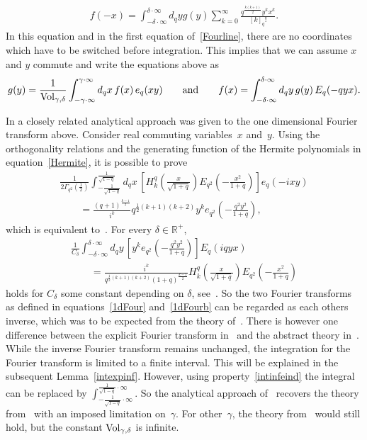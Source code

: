 \documentclass[pdftex]{sigma}
\newcommand{\mR}{\mathbb{R}}
\numberwithin{equation}{section}
\begin{document}
\begin{gather*}
f(-x) = \int_{-\delta\cdot\infty}^{\delta\cdot\infty}d_qyg(y)\sum_{k=0}^\infty\frac{q^{\frac{k(k+1)}{2}}y^kx^k}{[k]_q!}.
\end{gather*}
In this equation and in the f\/irst equation of~\eqref{Fourline}, there are no coordinates which have to be switched before integration. This implies that we can assume $x$ and $y$ commute and write the equations above as
\begin{gather*}
g(y)=\frac{1}{{\rm Vol}_{\gamma,\delta}}\int_{-\gamma\cdot\infty}^{\gamma\cdot\infty}d_qx\,f(x)\,e_q(xy)\qquad \mbox{and}\qquad f(x)=\int_{-\delta\cdot\infty}^{\delta\cdot\infty}d_qy\,g(y)\,E_q(-qyx).
\end{gather*}



In \cite{MR1448685} a closely related analytical approach was given to the one dimensional Fourier transform above. Consider real commuting variables~$x$ and~$y$. Using the orthogonality relations and the generating function of the Hermite polynomials in equation~\eqref{Hermite}, it is possible to prove
\begin{gather}
\frac{1}{2\Gamma_{q^2}(\frac{1}{2})}\int_{-\frac{1}{\sqrt{1-q}}}^{\frac{1}{\sqrt{1-q}}}d_qx\, \left[H_k^q\left(\frac{x}{\sqrt{1+q}}\right)E_{q^2}\left(-\frac{x^2}{1+q}\right)\right]e_q(-ixy)\nonumber\\
\qquad{}
=\frac{(q+1)^{\frac{k-1}{2}}}{i^k}q^{\frac{1}{2}(k+1)(k+2)}y^ke_{q^2}\left(-\frac{q^2y^2}{1+q}\right),\label{1dFour}
\end{gather}
which is equivalent to~\cite[equation~(8.7)]{MR1448685}. For every $\delta\in\mR^+$,
\begin{gather}
\frac{1}{C_\delta}\int_{-\delta\cdot\infty}^{\delta\cdot\infty}d_qy\, \left[y^ke_{q^2}\left(-\frac{q^2y^2}{1+q}\right)\right]E_q(iqyx)\nonumber\\
\qquad =\frac{i^k}{q^{\frac{1}{2}(k+1)(k+2)}(1+q)^{\frac{k-1}{2}}}H_k^q\left(\frac{x}{\sqrt{1+q}}\right)E_{q^2}\left(-\frac{x^2}{1+q}\right)\label{1dFourb}
\end{gather}
holds for $C_\delta$ some constant depending on $\delta$, see~\cite[equation~(8.21)]{MR1448685}. So the two Fourier transforms as def\/ined in equations~\eqref{1dFour} and~\eqref{1dFourb} can be regarded as each others inverse, which was to be expected from the theory of~\cite{MR1303081}. There is however one dif\/ference between the explicit Fourier transform in~\cite{MR1448685} and the abstract theory in~\cite{MR1303081}. While the inverse Fourier transform remains unchanged, the integration for the Fourier transform is limited to a f\/inite interval. This will be explained in the subsequent Lemma~\ref{intexpinf}. However, using property~\eqref{intinfeind} the integral can be replaced by $\int_{-\frac{1}{\sqrt{1-q}}\cdot\infty}^{\frac{1}{\sqrt{1-q}}\cdot\infty}$. So the analytical approach of~\cite{MR1448685} recovers the theory from~\cite{MR1303081} with an imposed limitation on~$\gamma$. For other~$\gamma$, the theory from~\cite{MR1303081} would still hold, but the constant ${\rm Vol}_{\gamma,\delta}$ is inf\/inite.
\end{document}
